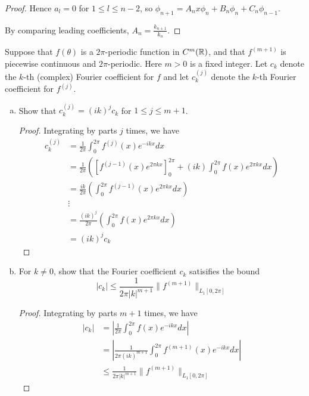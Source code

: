 \documentclass{article}
\begin{document}
\begin{enumerate}[(a)]
\begin{proof}
Hence $a_l = 0$ for $ 1 \le l \le n - 2$, so
$\phi_{n+1} = A_n x \phi_n + B_n \phi_n + C_n \phi_{n-1}.$ 

By comparing leading coefficients, $A_n = \frac {k_{n+1}}{k_n}$.
\end{proof}
\end{enumerate}


 Suppose that $f(\theta)$ is a $2 \pi$-periodic function in $C^m( \mathbb{R})$, and that $f^{(m+1)}$ is piecewise continuous and $2 \pi$-periodic. Here $m > 0$ is a fixed integer.  Let $c_k$ denote the $k$-th (complex) Fourier coefficient for $f$ and let $c_k^{(j)}$ denote the $k$-th Fourier coefficient for $f^{(j)}$.

\newcommand{\ckj}{c_k^{(j)}}

\begin{enumerate}[(a)]
\item Show that $\ckj = (ik)^j c_k$ for $1 \le j \le m+1$.

\begin{proof}
Integrating by parts $j$ times, we have
\begin{align*}
\ckj  & =  \frac 1 {2 \pi} \int_0^{2 \pi} f^{(j)}(x) e^{- i k x} dx 
\\ & = \frac 1 {2 \pi} \left( \left[ f^{(j-1)}(x) e^{2 \pi k x}  \right]_0^{2 \pi} + (ik)  \int_0^{2 \pi} f(x) e^{2\pi k x} dx \right)
\\ & = \frac  {ik} {2 \pi} \left( \int_0^{2 \pi} f^{(j-1)}(x) e^{2\pi k x} dx \right)
\\ & \vdots
\\ & = \frac  {(ik)^j} {2 \pi} \left( \int_0^{2 \pi} f(x) e^{2\pi k x} dx \right)
\\ & = (ik)^j c_k
\end{align*}
\end{proof}

\item For $k \neq 0$, show that the Fourier coefficient $c_k$ satisifies the bound
$$ | c_k | \le \frac 1 {2 \pi |k|^{m+1}} \|f^{(m+1)}\|_{L_1[0,2\pi]}$$

\begin{proof}
Integrating by parts $m+1$ times, we have
\begin{align*}
|c_k| & = \left| \frac 1 {2 \pi} \int_0^{2 \pi} f(x) e^{- i k x} dx \right|
\\ & = \left| \frac 1 {2 \pi (ik)^{m+1}} \int_0^{2 \pi} f^{(m+1)}(x) e^{- i k x} dx \right|
\\ & \le \frac 1 {2 \pi |k|^{m+1}} \|f^{(m+1)}\|_{L_1[0,2\pi]}
\end{align*}
\end{proof}


\end{enumerate}
\end{document}
